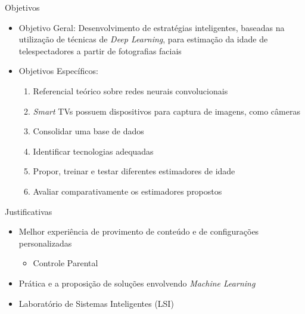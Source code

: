 \begin{frame}{Objetivos}
   \ \  \\[0.1cm]
  \begin{itemize}
  \item \alert{Objetivo Geral}: Desenvolvimento de estratégias inteligentes, baseadas na utilização de técnicas de \emph{Deep Learning}, para estimação da idade de telespectadores a partir de fotografias faciais
  \item \alert{Objetivos Específicos}:
  \begin{enumerate}
    \item Referencial teórico sobre redes neurais convolucionais
    \item \emph{Smart} TVs possuem dispositivos para captura de imagens, como câmeras
    \item Consolidar uma base de dados
    \item Identificar tecnologias adequadas
    \item Propor, treinar e testar diferentes estimadores de idade
    \item Avaliar comparativamente os estimadores propostos

  \end{enumerate}
\end{itemize}
\end{frame}

\begin{frame}{Justificativas}
  \begin{itemize}
  \item Melhor experiência de provimento de conteúdo e de configurações personalizadas
  \begin{itemize}
    \item \alert{Controle Parental}
  \end{itemize}
  \item Prática e a proposição de soluções envolvendo \emph{Machine Learning}
  \item Laboratório de Sistemas Inteligentes (LSI)
\end{itemize}
\end{frame}

